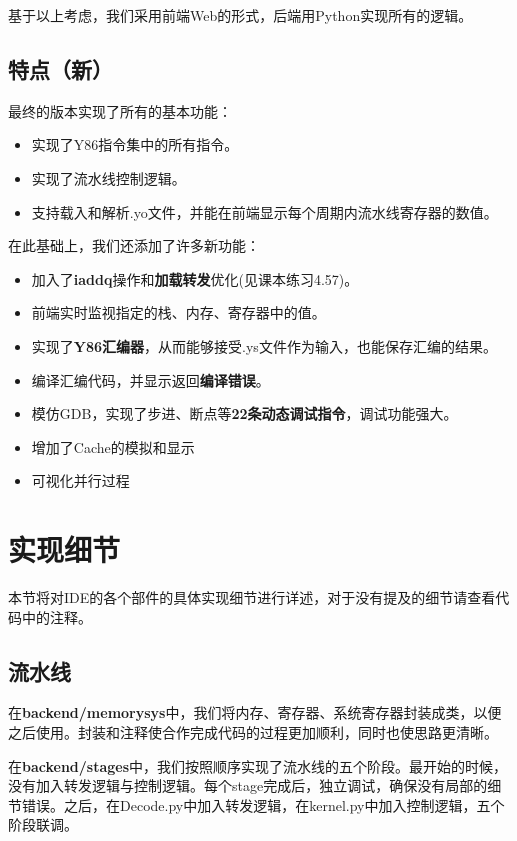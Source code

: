 \documentclass[a4paper,11pt,UTF8]{ctexart}
\begin{document}
\begin{sloppypar}
基于以上考虑，我们采用前端Web的形式，后端用Python实现所有的逻辑。

\subsection{{\bf 特点（新）}}

最终的版本实现了所有的基本功能：
\begin{itemize}
\item 实现了Y86指令集中的所有指令。
\item 实现了流水线控制逻辑。
\item 支持载入和解析.yo文件，并能在前端显示每个周期内流水线寄存器的数值。
\end{itemize}

在此基础上，我们还添加了许多新功能：
\begin{itemize}
\item 加入了{\bf iaddq}操作和{\bf 加载转发}优化(见课本练习4.57)。
\item 前端实时监视指定的栈、内存、寄存器中的值。
\item 实现了{\bf Y86汇编器}，从而能够接受.ys文件作为输入，也能保存汇编的结果。
\item 编译汇编代码，并显示返回{\bf 编译错误}。
\item 模仿GDB，实现了步进、断点等{\bf 22条动态调试指令}，调试功能强大。
\item 增加了Cache的模拟和显示
\item 可视化并行过程
\end{itemize}

\clearpage
\section{实现细节}

本节将对IDE的各个部件的具体实现细节进行详述，对于没有提及的细节请查看代码中的注释。

\subsection{{\bf 流水线}}

在{\bf backend/memory\underline{\hspace{0.5em}}sys}中，我们将内存、寄存器、系统寄存器封装成类，以便之后使用。封装和注释使合作完成代码的过程更加顺利，同时也使思路更清晰。

在{\bf backend/stages}中，我们按照顺序实现了流水线的五个阶段。最开始的时候，没有加入转发逻辑与控制逻辑。每个stage完成后，独立调试，确保没有局部的细节错误。之后，在Decode.py中加入转发逻辑，在kernel.py中加入控制逻辑，五个阶段联调。


\end{sloppypar}
\end{document}
